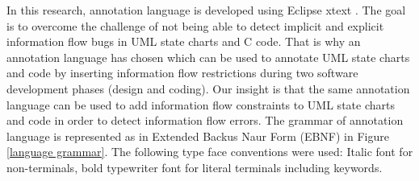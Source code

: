 In this research, annotation language is developed using Eclipse xtext \cite{ref_17_xtext:grammar}. The goal is to overcome the challenge of not being able to detect implicit and explicit information flow bugs in UML state charts and C code. That is why an annotation language has chosen
which can be used to annotate UML state charts and code by inserting information flow
restrictions during two software development phases (design
and coding). Our insight is that the same annotation language
can be used to add information flow constraints to UML state
charts and code in order to detect information flow errors. The grammar of annotation language is represented as in Extended Backus Naur Form (EBNF) in Figure \ref{language grammar}. The following type face conventions were used: Italic font for non-terminals, bold typewriter font for literal terminals including keywords.\\
 
